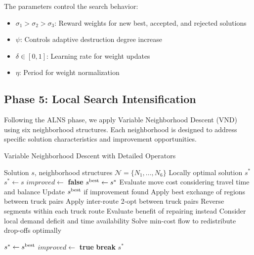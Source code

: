 The parameters control the search behavior:
\begin{itemize}
    \item $\sigma_1 > \sigma_2 > \sigma_3$: Reward weights for new best, accepted, and rejected solutions
    \item $\psi$: Controls adaptive destruction degree increase
    \item $\delta \in [0,1]$: Learning rate for weight updates
    \item $\eta$: Period for weight normalization
\end{itemize}

\subsection{Phase 5: Local Search Intensification}

Following the ALNS phase, we apply Variable Neighborhood Descent (VND) using six neighborhood structures. Each neighborhood is designed to address specific solution characteristics and improvement opportunities.

\begin{algorithm}[htbp]
    \caption{Variable Neighborhood Descent with Detailed Operators}
    \label{alg:vnd}
    \begin{algorithmic}[1]
        \Require Solution $s$, neighborhood structures $\mathcal{N} = \{N_1, ..., N_6\}$
        \Ensure Locally optimal solution $s^*$
        \State $s^* \leftarrow s$
        \Repeat
        \State $improved \leftarrow$ \textbf{false}
        \State $s^{\text{best}} \leftarrow s^*$
         
        \State Evaluate move cost considering travel time and balance
        \State Update $s^{\text{best}}$ if improvement found
        \EndIf
        \EndFor
        \EndFor
        \EndFor
        \EndFor
         
        \State Apply best exchange of regions between truck pairs
         
        \State Apply inter-route 2-opt between truck pairs
         
        \State Reverse segments within each truck route
         
        \State Evaluate benefit of repairing instead
        \State Consider local demand deficit and time availability
        \EndFor
         
        \State Solve min-cost flow to redistribute drop-offs optimally
        \EndIf

        \State $s^* \leftarrow s^{\text{best}}$
        \State $improved \leftarrow$ \textbf{true}
        \State \textbf{break} 
        \EndIf
        \EndFor
        \State \Return $s^*$
    \end{algorithmic}
\end{algorithm}

